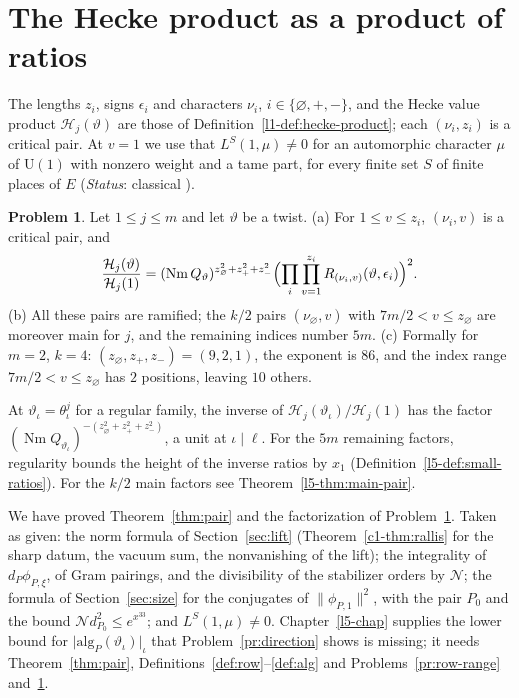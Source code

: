 \documentclass[reqno]{amsart}
\newcounter{chap}
\theoremstyle{definition}
\newtheorem{problem}{Problem}[section]
\theoremstyle{plain}
\theoremstyle{remark}
\newcommand{\Nc}{\mathcal{N}}
\newcommand{\Hc}{\mathcal{H}}
\newcommand{\Nm}{\operatorname{Nm}}
\newcommand{\alg}{\mathrm{alg}}
\begin{document}
\section{The Hecke product as a product of ratios}\label{sec:product}

The lengths \(z_i\), signs \(\epsilon_i\) and characters \(\nu_i\), \(i \in \{\varnothing, +, -\}\), and the Hecke value product \(\Hc_j(\vartheta)\) are those of Definition~\ref{l1-def:hecke-product}; each \((\nu_i, z_i)\) is a critical pair.  At \(v = 1\) we use that \(L^S(1, \mu) \ne 0\) for an automorphic character \(\mu\) of \(\mathrm U(1)\) with nonzero weight and a tame part, for every finite set \(S\) of finite places of \(E\) (\emph{Status}: classical \cite[Ch.~XV]{La}).

\begin{problem}\label{pr:hecke-product}
Let \(1 \le j \le m\) and let \(\vartheta\) be a twist.
\textup{(a)} For \(1 \le v \le z_i\), \((\nu_i, v)\) is a critical pair, and
\[
  \frac{\Hc_j(\vartheta)}{\Hc_j(1)} = (\Nm Q_\vartheta)^{z_\varnothing^2 + z_+^2 + z_-^2} \Bigl(\prod_{i}\prod_{v=1}^{z_i} R_{(\nu_i, v)}(\vartheta, \epsilon_i)\Bigr)^2 .
\]
\textup{(b)} All these pairs are ramified; the \(k/2\) pairs \((\nu_\varnothing, v)\) with \(7m/2 < v \le z_\varnothing\) are moreover main for \(j\), and the remaining indices number \(5m\).
\textup{(c)} Formally for \(m = 2\), \(k = 4\): \((z_\varnothing, z_+, z_-) = (9, 2, 1)\), the exponent is \(86\), and the index range \(7m/2 < v \le z_\varnothing\) has \(2\) positions, leaving \(10\) others.
\end{problem}

At \(\vartheta_\iota = \theta_\iota^j\) for a regular family, the inverse of \(\Hc_j(\vartheta_\iota)/\Hc_j(1)\) has the factor \((\Nm Q_{\vartheta_\iota})^{-(z_\varnothing^2+z_+^2+z_-^2)}\), a unit at \(\iota \mid \ell\).  For the \(5m\) remaining factors, regularity bounds the height of the inverse ratios by \(x_1\) (Definition~\ref{l5-def:small-ratios}).  For the \(k/2\) main factors see Theorem~\ref{l5-thm:main-pair}.

We have proved Theorem~\ref{thm:pair} and the factorization of Problem~\ref{pr:hecke-product}.  Taken as given: the norm formula of Section~\ref{sec:lift} (Theorem~\ref{c1-thm:rallis} for the sharp datum, the vacuum sum, the nonvanishing of the lift); the integrality of \(d_P\phi_{P,\xi}\), of Gram pairings, and the divisibility of the stabilizer orders by \(\Nc\); the formula of Section~\ref{sec:size} for the conjugates of \(\lVert\phi_{P,1}\rVert^2\), with the pair \(P_0\) and the bound \(\Nc d_{P_0}^2 \le e^{x^{33}}\); and \(L^S(1,\mu) \ne 0\).  Chapter~\ref{l5-chap} supplies the lower bound for \(\lvert\alg_P(\vartheta_\iota)\rvert_\iota\) that Problem~\ref{pr:direction} shows is missing; it needs Theorem~\ref{thm:pair}, Definitions~\ref{def:row}--\ref{def:alg} and Problems~\ref{pr:row-range} and~\ref{pr:hecke-product}.
\end{document}
